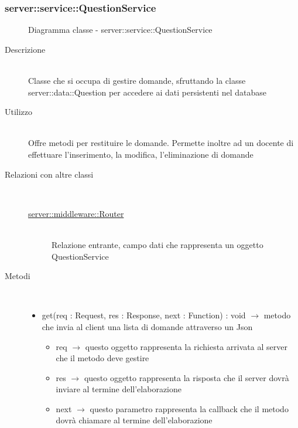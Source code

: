\subsubsection[QuestionService]{server::service::QuestionService}
\begin{figure}[H]
	\centering
	\caption{Diagramma classe - server::service::QuestionService}
\end{figure}\begin{description}
\item[Descrizione] \hfill \\
Classe che si occupa di gestire domande, sfruttando la classe server::data::Question per accedere ai dati persistenti nel database
\item[Utilizzo] \hfill \\
Offre metodi per restituire le domande. Permette inoltre ad un docente di effettuare l'inserimento, la modifica, l'eliminazione di domande
\item[Relazioni con altre classi] \hfill \\
\vspace{-7mm}
\begin{description}
	\item[\hyperlink{server::middleware::Router}{server::middleware::Router}] \hfill \\
	Relazione entrante, campo dati che rappresenta un oggetto QuestionService
\end{description}

\item[Metodi] \hfill \\
\vspace{-7mm}
\begin{itemize}
	\item get(req : Request, res : Response, next : Function) : void $\rightarrow$ metodo che invia al client una lista di domande attraverso un Json\begin{itemize}
		\item req $\rightarrow$ questo oggetto rappresenta la richiesta arrivata al server che il metodo deve gestire
		\item res $\rightarrow$ questo oggetto rappresenta la risposta che il server dovrà inviare al termine dell'elaborazione
		\item next $\rightarrow$ questo parametro rappresenta la callback che il metodo dovrà chiamare al termine dell’elaborazione
	\end{itemize}
	

\end{itemize}
\end{description}
